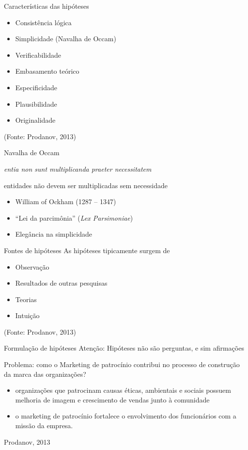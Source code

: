 \documentclass{beamer}
\begin{document}
\begin{frame}{Características das hipóteses}
  \begin{itemize}
  \item Consistência lógica
  \item Simplicidade (Navalha de Occam)
  \item Verificabilidade
  \item Embasamento teórico
  \item Especificidade
  \item Plausibilidade
  \item Originalidade
  \end{itemize}
  (Fonte: Prodanov, 2013)
\end{frame}

\begin{frame}{Navalha de Occam}
  \begin{definition}
    {\em entia non sunt multiplicanda praeter necessitatem}

    \bigskip
    entidades não devem ser multiplicadas sem necessidade
  \end{definition}
  \begin{itemize}
  \item William of Ockham (1287 -- 1347)
  \item ``Lei da parcimônia'' ({\em Lex Parsimoniae})
  \item Elegância na simplicidade
  \end{itemize}
\end{frame}
\begin{frame}{Fontes de hipóteses}
  As hipóteses tipicamente surgem de
  \begin{itemize}
  \item Observação
  \item Resultados de outras pesquisas
  \item Teorias
  \item Intuição
  \end{itemize}
  (Fonte: Prodanov, 2013)
\end{frame}

\begin{frame}{Formulação de hipóteses}
Atenção: Hipóteses não são perguntas, e sim afirmações

\begin{example}
  Problema: como o Marketing de patrocínio contribui no processo de
  construção da marca das organizações?

  \begin{itemize}
  \item organizações que patrocinam causas éticas, ambientais e
    sociais possuem melhoria de imagem e crescimento de vendas junto à
    comunidade
  \item o marketing de patrocínio fortalece o envolvimento dos
    funcionários com a missão da empresa.
  \end{itemize}
  Prodanov, 2013
\end{example}
\end{frame}
\end{document}
